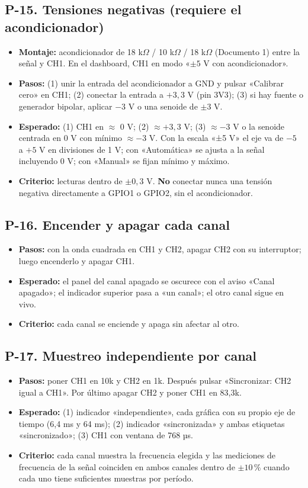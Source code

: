 \documentclass[12pt,a4paper]{article}
\begin{document}
\subsection*{P-15. Tensiones negativas (requiere el acondicionador)}
\begin{itemize}
  \item \textbf{Montaje:} acondicionador de 18 k$\Omega$ / 10 k$\Omega$ / 18 k$\Omega$ (Documento 1) entre la señal y CH1. En el dashboard, CH1 en modo «$\pm 5$ V con acondicionador».
  \item \textbf{Pasos:} (1) unir la entrada del acondicionador a GND y pulsar «Calibrar cero» en CH1; (2) conectar la entrada a $+3{,}3$ V (pin 3V3); (3) si hay fuente o generador bipolar, aplicar $-3$ V o una senoide de $\pm 3$ V.
  \item \textbf{Esperado:} (1) CH1 en $\approx$ 0 V; (2) $\approx +3{,}3$ V; (3) $\approx -3$ V o la senoide centrada en 0 V con mínimo $\approx -3$ V. Con la escala «±5 V» el eje va de $-5$ a $+5$ V en divisiones de 1 V; con «Automática» se ajusta a la señal incluyendo 0 V; con «Manual» se fijan mínimo y máximo.
  \item \textbf{Criterio:} lecturas dentro de $\pm 0{,}3$ V. \textbf{No} conectar nunca una tensión negativa directamente a GPIO1 o GPIO2, sin el acondicionador.
\end{itemize}

\subsection*{P-16. Encender y apagar cada canal}
\begin{itemize}
  \item \textbf{Pasos:} con la onda cuadrada en CH1 y CH2, apagar CH2 con su interruptor; luego encenderlo y apagar CH1.
  \item \textbf{Esperado:} el panel del canal apagado se oscurece con el aviso «Canal apagado»; el indicador superior pasa a «un canal»; el otro canal sigue en vivo.
  \item \textbf{Criterio:} cada canal se enciende y apaga sin afectar al otro.
\end{itemize}

\subsection*{P-17. Muestreo independiente por canal}
\begin{itemize}
  \item \textbf{Pasos:} poner CH1 en 10k y CH2 en 1k. Después pulsar «Sincronizar: CH2 igual a CH1». Por último apagar CH2 y poner CH1 en 83,3k.
  \item \textbf{Esperado:} (1) indicador «independiente», cada gráfica con su propio eje de tiempo (6,4 ms y 64 ms); (2) indicador «sincronizada» y ambas etiquetas «sincronizado»; (3) CH1 con ventana de 768 µs.
  \item \textbf{Criterio:} cada canal muestra la frecuencia elegida y las mediciones de frecuencia de la señal coinciden en ambos canales dentro de $\pm 10\,\%$ cuando cada uno tiene suficientes muestras por período.
\end{itemize}
\end{document}
